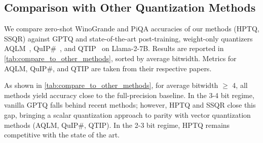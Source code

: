 \documentclass{article} %
\begin{document}
\clearpage

\subsection{Comparison with Other Quantization Methods}
\label{sec:app_experiments_metrics_comparison}

We compare zero-shot WinoGrande and PiQA accuracies of our methods (HPTQ, SSQR) against GPTQ and state-of-the-art post-training, weight-only quantizers AQLM~\citep{pmlr-v235-egiazarian24a}, QuIP\#~\citep{pmlr-v235-tseng24a}, and QTIP~\citep{NEURIPS2024_6de2e84b} on Llama-2-7B.
Results are reported in \cref{tab:compare_to_other_methods}, sorted by average bitwidth.
Metrics for AQLM, QuIP\#, and QTIP are taken from their respective papers.

As shown in \cref{tab:compare_to_other_methods}, for average bitwidth $\ge$ 4, all methods yield accuracy close to the full-precision baseline.
In the 3-4 bit regime, vanilla GPTQ falls behind recent methods; however, HPTQ and SSQR close this gap, bringing a scalar quantization approach to parity with vector quantization methods (AQLM, QuIP\#, QTIP).
In the 2-3 bit regime, HPTQ remains competitive with the state of the art.
\end{document}
